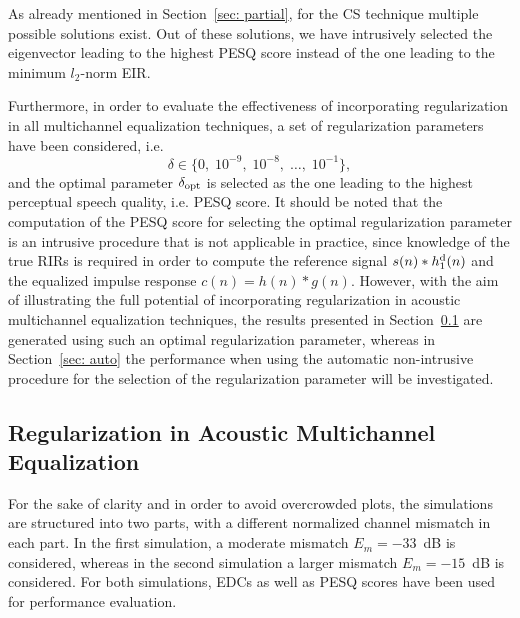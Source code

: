 \documentclass[draftcls,onecolumn,11pt]{IEEEtran}
\begin{document}
As already mentioned in Section~\ref{sec: partial}, for the CS technique multiple possible solutions exist.
Out of these solutions, we have intrusively selected the eigenvector leading to the highest PESQ score instead of the one leading to the minimum $l_2$-norm EIR.

Furthermore, in order to evaluate the effectiveness of incorporating regularization in all multichannel equalization techniques, a set of regularization parameters have been considered, i.e.
\begin{equation}
\delta \in \{0, \; 10^{-9}, \; 10^{-8}, \; \ldots, \; 10^{-1} \},
\end{equation}
and the optimal parameter $\delta_{\rm opt}$ is selected as the one leading to the highest perceptual speech quality, i.e. PESQ score.
It should be noted that the computation of the PESQ score for selecting the optimal regularization parameter is an intrusive procedure that is not applicable in practice, since knowledge of the true RIRs is required in order to compute the reference signal $s(n) \ast h_1^{\rm d}(n)$ and the equalized impulse response $c(n) = h(n) \ast g(n)$.
However, with the aim of illustrating the full potential of incorporating regularization in acoustic multichannel equalization techniques, the results presented in Section~\ref{sec: regacsys} are generated using such an optimal regularization parameter, whereas in Section~\ref{sec: auto} the performance when using the automatic non-intrusive procedure for the selection of the regularization parameter will be investigated.

\subsection{Regularization in Acoustic Multichannel Equalization}
\label{sec: regacsys}
For the sake of clarity and in order to avoid overcrowded plots, the simulations are structured into two parts, with a different normalized channel mismatch in each part.
In the first simulation, a moderate mismatch $E_m = -33$~dB is considered, whereas in the second simulation a larger mismatch $E_m = -15$~dB is considered.
For both simulations, EDCs as well as PESQ scores have been used for performance evaluation.
\end{document}
